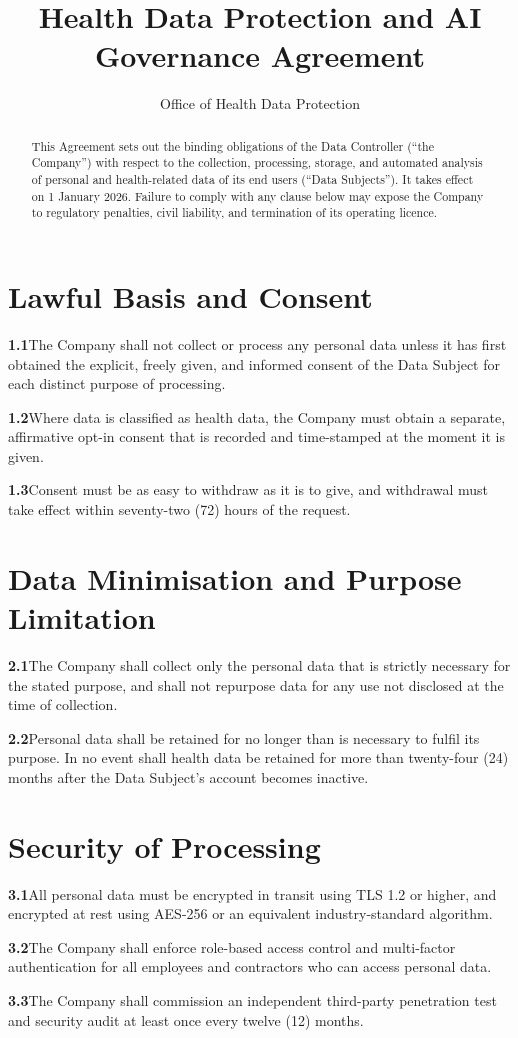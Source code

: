 \documentclass[acmsmall,nonacm]{acmart}
\newcommand{\clause}[2]{\par\smallskip\noindent\textbf{#1}\quad #2}
\begin{document}
\title{Health Data Protection and AI Governance Agreement}
\author{Office of Health Data Protection}
\renewcommand{\shortauthors}{Health Data Protection Agreement}
\authorsaddresses{}  %

\begin{abstract}
This Agreement sets out the binding obligations of the Data Controller (``the Company'')
with respect to the collection, processing, storage, and automated analysis of personal
and health-related data of its end users (``Data Subjects''). It takes effect on
1 January 2026. Failure to comply with any clause below may expose the Company to
regulatory penalties, civil liability, and termination of its operating licence.
\end{abstract}

\maketitle

\section{Lawful Basis and Consent}
\clause{1.1}{The Company shall not collect or process any personal data unless it has first
obtained the explicit, freely given, and informed consent of the Data Subject for each
distinct purpose of processing.}
\clause{1.2}{Where data is classified as health data, the Company must obtain a separate,
affirmative opt-in consent that is recorded and time-stamped at the moment it is given.}
\clause{1.3}{Consent must be as easy to withdraw as it is to give, and withdrawal must take
effect within seventy-two (72) hours of the request.}

\section{Data Minimisation and Purpose Limitation}
\clause{2.1}{The Company shall collect only the personal data that is strictly necessary for
the stated purpose, and shall not repurpose data for any use not disclosed at the time of
collection.}
\clause{2.2}{Personal data shall be retained for no longer than is necessary to fulfil its
purpose. In no event shall health data be retained for more than twenty-four (24) months
after the Data Subject's account becomes inactive.}

\section{Security of Processing}
\clause{3.1}{All personal data must be encrypted in transit using TLS 1.2 or higher, and
encrypted at rest using AES-256 or an equivalent industry-standard algorithm.}
\clause{3.2}{The Company shall enforce role-based access control and multi-factor
authentication for all employees and contractors who can access personal data.}
\clause{3.3}{The Company shall commission an independent third-party penetration test and
security audit at least once every twelve (12) months.}
\end{document}
